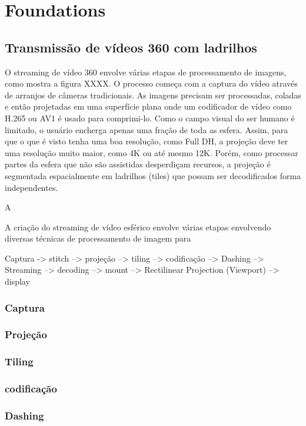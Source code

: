 
\chapter{Foundations}\label{Cap:Foundations}

\section{Transmissão de vídeos 360 com ladrilhos}

O streaming de vídeo 360 envolve várias etapas de processamento de imagens, como mostra a figura XXXX. O processo começa com a captura do vídeo através de arranjos de câmeras tradicionais. As imagens precisam ser processadas, coladas e então projetadas em uma superfície plana onde um codificador de vídeo como H.265 ou AV1 é usado para comprimi-lo. Como o campo visual do ser humano é limitado, o usuário encherga apenas uma fração de toda as esfera. Assim, para que o que é visto tenha uma boa resolução, como Full DH, a projeção deve ter uma resolução muito maior, como 4K ou até mesmo 12K. Porém, como processar partes da esfera que não são assistidas desperdiçam recursos, a projeção é segmentada espacialmente em ladrilhos (tiles) que possam ser decodificados forma independentes.

A

A criação do streaming de vídeo esférico envolve várias etapas envolvendo diversas técnicas de processamento de imagem para

Captura -> stitch --> projeção --> tiling --> codificação -->  Dashing --> Streaming --> decoding --> mount --> Rectilinear Projection (Viewport) --> display

\subsection{Captura}
\subsection{Projeção}
\subsection{Tiling}
\subsection{codificação}
\subsection{Dashing}
